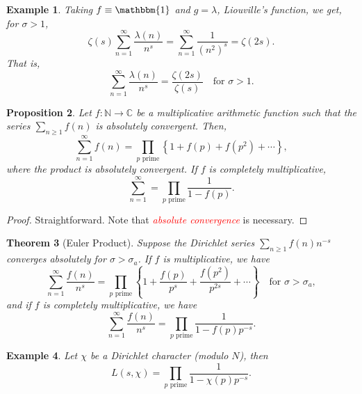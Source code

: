 \documentclass[12pt]{article}
\theoremstyle{thmstyle}
\newtheorem{theorem}{Theorem}[section]
\newtheorem{proposition}[theorem]{Proposition}
\theoremstyle{defstyle}
\newtheorem{example}[theorem]{Example}
\newcommand{\N}{\mathbb{N}}
\newcommand{\bbC}{\mathbb{C}}
\newcommand{\caution}[1]{\textcolor{red}{\textit{#1}}}
\renewcommand{\ge}{\geqslant}
\begin{document}
\begin{example}
    Taking $f\equiv\mathbbm{1}$ and $g = \lambda$, Liouville's function, we get, for $\sigma > 1$, 
    \begin{equation*}
        \zeta(s)\sum_{n = 1}^\infty\frac{\lambda(n)}{n^s} = \sum_{n = 1}^\infty\frac{1}{(n^2)^s} = \zeta(2s).
    \end{equation*}
    That is, 
    \begin{equation*}
        \sum_{n = 1}^\infty\frac{\lambda(n)}{n^s} = \frac{\zeta(2s)}{\zeta(s)}\quad\text{for }\sigma > 1.
    \end{equation*}
\end{example}

\begin{proposition}
    Let $f: \N\to\bbC$ be a multiplicative arithmetic function such that the series $\sum_{n\ge 1} f(n)$ is absolutely convergent. Then, 
    \begin{equation*}
        \sum_{n = 1}^\infty f(n) = \prod_{p\text{ prime}}\left\{1 + f(p) + f(p^2) + \cdots\right\},
    \end{equation*}
    where the product is absolutely convergent. If $f$ is completely multiplicative, 
    \begin{equation*}
        \sum_{n = 1}^\infty = \prod_{p\text{ prime}}\frac{1}{1 - f(p)}.
    \end{equation*}
\end{proposition}
\begin{proof}
    Straightforward. Note that \caution{absolute convergence} is necessary.
\end{proof}

\begin{theorem}[Euler Product]
    Suppose the Dirichlet series $\sum_{n\ge 1} f(n)n^{-s}$ converges absolutely for $\sigma > \sigma_a$. If $f$ is multiplicative, we have 
    \begin{equation*}
        \sum_{n = 1}^\infty\frac{f(n)}{n^s} = \prod_{p\text{ prime}}\left\{1 + \frac{f(p)}{p^s} + \frac{f(p^2)}{p^{2s}} + \cdots\right\}\quad\text{for }\sigma > \sigma_a,
    \end{equation*}
    and if $f$ is completely multiplicative, we have 
    \begin{equation*}
        \sum_{n = 1}^\infty\frac{f(n)}{n^s} = \prod_{p\text{ prime}}\frac{1}{1 - f(p)p^{-s}}.
    \end{equation*}
\end{theorem}

\begin{example}
    Let $\chi$ be a Dirichlet character (modulo $N$), then 
    \begin{equation*}
        L(s,\chi) = \prod_{p \text{ prime}}\frac{1}{1 - \chi(p)p^{-s}}.
    \end{equation*}
\end{example}
\end{document}
